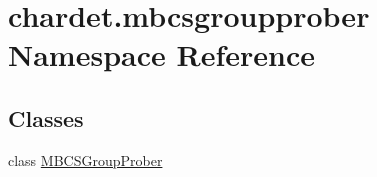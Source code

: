 \hypertarget{namespacechardet_1_1mbcsgroupprober}{}\section{chardet.\+mbcsgroupprober Namespace Reference}
\label{namespacechardet_1_1mbcsgroupprober}
\subsection*{Classes}
\begin{DoxyCompactItemize}
\item 
class \hyperlink{classchardet_1_1mbcsgroupprober_1_1_m_b_c_s_group_prober}{M\+B\+C\+S\+Group\+Prober}
\end{DoxyCompactItemize}
